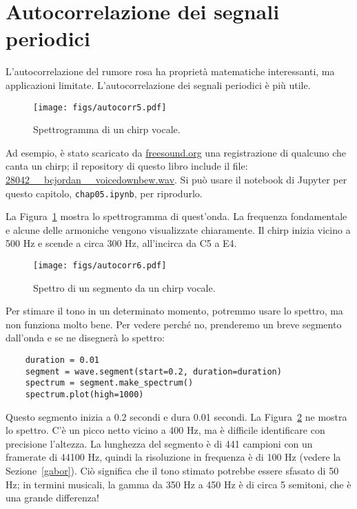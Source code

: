 \documentclass[12pt,a4paper]{book}
\begin{document}
\section{Autocorrelazione dei segnali periodici} 

L'autocorrelazione del rumore rosa ha proprietà matematiche interessanti, ma applicazioni limitate. L'autocorrelazione dei segnali periodici è più utile.

\begin{figure} 

\centerline{\texttt{[image: figs/autocorr5.pdf]}} \caption{Spettrogramma di un chirp vocale.} \label{fig.autocorr5} \end{figure} 

Ad esempio, è stato scaricato da \url{freesound.org} una registrazione di qualcuno che canta un chirp; il repository di questo libro include il file: \url{28042__bcjordan__voicedownbew.wav}. Si può usare il notebook di Jupyter per questo capitolo, {\tt chap05.ipynb}, per riprodurlo.

La Figura~\ref{fig.autocorr5} mostra lo spettrogramma di quest'onda. La frequenza fondamentale e alcune delle armoniche vengono visualizzate chiaramente. Il chirp inizia vicino a 500 Hz e scende a circa 300 Hz, all'incirca da C5 a E4.

\begin{figure} 

\centerline{\texttt{[image: figs/autocorr6.pdf]}} \caption{Spettro di un segmento da un chirp vocale.} \label{fig.autocorr6} \end{figure} 

Per stimare il tono in un determinato momento, potremmo usare lo spettro, ma non funziona molto bene. Per vedere perché no, prenderemo un breve segmento dall'onda e se ne disegnerà lo spettro:

\begin{verbatim} 
    duration = 0.01
    segment = wave.segment(start=0.2, duration=duration)
    spectrum = segment.make_spectrum()
    spectrum.plot(high=1000)
 \end{verbatim} 

Questo segmento inizia a 0.2 secondi e dura 0.01 secondi. La Figura~\ref{fig.autocorr6} ne mostra lo spettro. C'è un picco netto vicino a 400 Hz, ma è difficile identificare con precisione l'altezza. La lunghezza del segmento è di 441 campioni con un framerate di 44100 Hz, quindi la risoluzione in frequenza è di 100 Hz (vedere la Sezione~\ref{gabor}). Ciò significa che il tono stimato potrebbe essere sfasato di 50 Hz; in termini musicali, la gamma da 350 Hz a 450 Hz è di circa 5 semitoni, che è una grande differenza!
\end{document}
